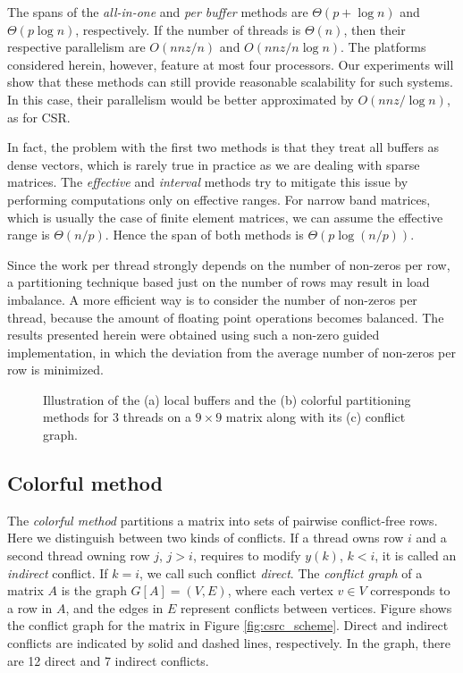 \documentclass[11pt]{article}
\begin{document}
The spans of the \textit{all-in-one} and \textit{per buffer} methods are $\Theta(p + \log n)$ and $\Theta(p\log n)$, respectively.
If the number of threads is $\Theta(n)$, then their respective parallelism are $O(nnz / n)$ and $O(nnz/n\log n)$.
The platforms considered herein,
however, feature at most four processors. Our experiments will show that
these methods can still provide reasonable scalability for such systems.
In this case, their parallelism would be better approximated by $O(nnz / \log n)$, as for CSR.

In fact, the problem with the first two methods is that they treat all buffers as dense vectors, which is rarely true in practice as we are dealing with sparse matrices.
The \textit{effective} and \textit{interval} methods try to mitigate this issue by performing computations only on effective ranges.
For narrow band matrices, which is usually the case of finite element matrices, we can assume the effective range is $\Theta(n/p)$.
Hence the span of both methods is $\Theta(p \log (n/p))$.

Since the work per thread strongly depends on the number of non-zeros per row,
a partitioning technique based just on the number of rows may result in load
imbalance.  A more efficient way is to consider the number of non-zeros per
thread, because the amount of floating point operations becomes balanced.  The
results presented herein were obtained using such a non-zero guided implementation,
in which the deviation from the average number of non-zeros per row
is minimized.

\begin{figure}[t]
\centering
{}
\hfil
{}
\hfil
{}
\caption{Illustration of the (a) local buffers and the (b) colorful
partitioning methods for 3 threads on a $9 \times 9$ matrix along with its (c) conflict graph.}
\label{fig:partitioning}
\end{figure}

\subsection{Colorful method}

The \textit{colorful method} partitions a matrix into sets of pairwise
conflict-free rows.
Here we distinguish between two kinds of conflicts.
If a thread owns row $i$ and a second thread owning row $j$, $j > i$, requires
to modify $y(k)$, $k < i$, it is called an \textit{indirect} conflict.
If $k = i$, we call such conflict \textit{direct}.
The \textit{conflict graph} of a matrix $A$ is the graph $G[A] = (V,E)$,
where each vertex $v \in V$ corresponds to a row in $A$, and the edges in $E$
represent conflicts between vertices.
Figure  shows the conflict graph for the matrix in
Figure \ref{fig:csrc_scheme}.
Direct and indirect conflicts are indicated by solid and dashed lines,
respectively.  In the graph, there are 12 direct and 7 indirect conflicts.
\end{document}
